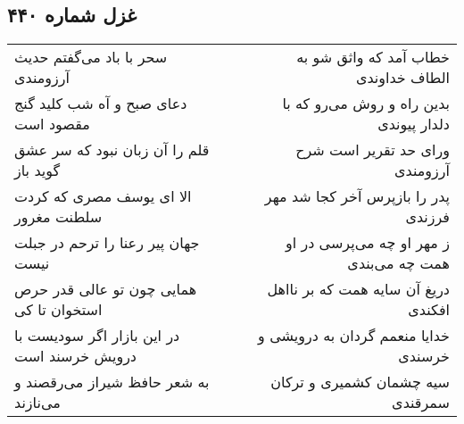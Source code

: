 \begin{center}
\section*{غزل شماره ۴۴۰}
\label{sec:sh440}
\begin{longtable}{l p{0.5cm} r}
سحر با باد می‌گفتم حدیث آرزومندی
&&
خطاب آمد که واثق شو به الطاف خداوندی
\\
دعای صبح و آه شب کلید گنج مقصود است
&&
بدین راه و روش می‌رو که با دلدار پیوندی
\\
قلم را آن زبان نبود که سر عشق گوید باز
&&
ورای حد تقریر است شرح آرزومندی
\\
الا ای یوسف مصری که کردت سلطنت مغرور
&&
پدر را بازپرس آخر کجا شد مهر فرزندی
\\
جهان پیر رعنا را ترحم در جبلت نیست
&&
ز مهر او چه می‌پرسی در او همت چه می‌بندی
\\
همایی چون تو عالی قدر حرص استخوان تا کی
&&
دریغ آن سایه همت که بر نااهل افکندی
\\
در این بازار اگر سودیست با درویش خرسند است
&&
خدایا منعمم گردان به درویشی و خرسندی
\\
به شعر حافظ شیراز می‌رقصند و می‌نازند
&&
سیه چشمان کشمیری و ترکان سمرقندی
\\
\end{longtable}
\end{center}

